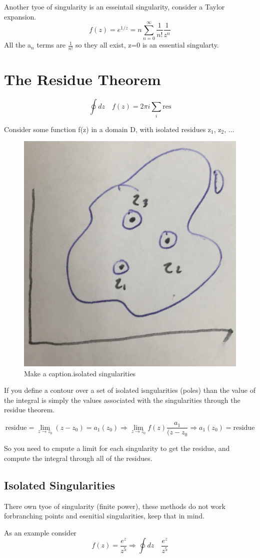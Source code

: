 \documentclass{article}
\newcommand{\be}{\begin{equation}}
\newcommand{\ee}{\end{equation}}
\begin{document}
Another tyoe of singularity is an esseintail singularity, consider a Taylor expansion.
\be
f(z) = e^{1/z} =n\sum_{n=0}^\infty \frac{1}{n!}\frac{1}{z^n}
\ee
All the a$_n$ terms are $\frac{1}{n!}$ so they all exist, z=0 is an essential singularty. 

\section*{The Residue Theorem}
\be
\oint dz \quad f(z) = 2\pi i\sum_i \text{res}
\ee

Consider some function f(z) in a domain D, with isolated residues z$_1$, z$_2$, ...

\begin{figure}[H]
  \centering
    \includegraphics[scale=0.2]{Figures/res.png}
    \caption{Make a caption.isolated singularities} 
\end{figure}

If you define a contour over a set of isolated isngularities (poles) than the value of the integral is simply the values associated with the singularities through the residue theorem. 

\be
\text{residue} = \lim_{z \rightarrow z_0}{(z-z_0)} = a_1(z_0) \Rightarrow \lim_{z \rightarrow z_0}{f(z)} \frac{a_1}{(z-z_0} \Rightarrow a_1(z_0) = \text{residue}
\ee

So you need to cmpute a limit for each singularity to get the residue, and compute the integral through all of the residues. 

\subsection*{Isolated Singularities}
There own tyoe of singularity (finite power), these methods do not work forbranching points and esenitial  singularities, keep that in mind. 

As an example consider
\be
f(z) = \frac{e^z}{z^5} \Rightarrow \oint dz \quad \frac{e^z}{z^5}
\ee
\end{document}
